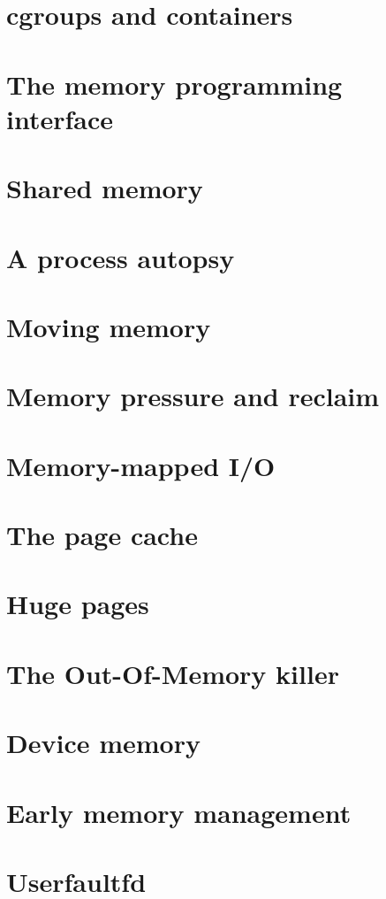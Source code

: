 \documentclass[a4paper,oneside]{scrbook}
\begin{document}
\chapter{cgroups and containers}


\chapter{The memory programming interface}


\chapter{Shared memory}


\chapter{A process autopsy}


\chapter{Moving memory}


\chapter{Memory pressure and reclaim}


\chapter{Memory-mapped I/O}


\chapter{The page cache}


\chapter{Huge pages}


\chapter{The Out-Of-Memory killer}


\chapter{Device memory}


\chapter{Early memory management}

\chapter{Userfaultfd}


\backmatter
\nocite{*}
\printbibliography[title=References]
\printindex
\end{document}
